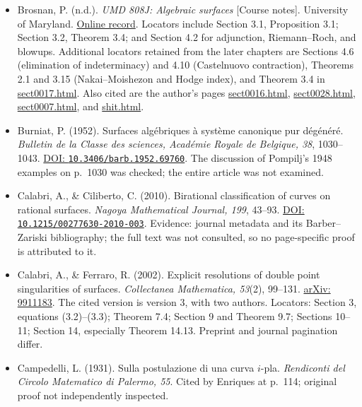 \begin{sloppypar}
\begin{itemize}
\item Brosnan, P. (n.d.). \emph{UMD 808J: Algebraic surfaces} {[}Course notes{]}. University of Maryland. \href{https://math.umd.edu/~pbrosnan/notes/Surfaces/index.html}{Online record}. Locators include Section 3.1, Proposition 3.1; Section 3.2, Theorem 3.4; and Section 4.2 for adjunction, Riemann--Roch, and blowups. Additional locators retained from the later chapters are Sections 4.6 (elimination of indeterminacy) and 4.10 (Castelnuovo contraction), Theorems 2.1 and 3.15 (Nakai--Moishezon and Hodge index), and Theorem 3.4 in \href{https://math.umd.edu/~pbrosnan/notes/Surfaces/sect0017.html}{sect0017.html}. Also cited are the author's pages \href{https://math.umd.edu/~pbrosnan/notes/Surfaces/sect0016.html}{sect0016.html}, \href{https://math.umd.edu/~pbrosnan/notes/Surfaces/sect0028.html}{sect0028.html}, \href{https://math.umd.edu/~pbrosnan/notes/Surfaces/sect0007.html}{sect0007.html}, and \href{https://math.umd.edu/~pbrosnan/notes/Surfaces/shit.html}{shit.html}.

\item Burniat, P. (1952). Surfaces algébriques à système canonique pur dégénéré. \emph{Bulletin de la Classe des sciences, Académie Royale de Belgique, 38}, 1030--1043. \href{https://doi.org/10.3406/barb.1952.69760}{DOI: \nolinkurl{10.3406/barb.1952.69760}}. The discussion of Pompilj's 1948 examples on p.~1030 was checked; the entire article was not examined.

\item Calabri, A., \& Ciliberto, C. (2010). Birational classification of curves on rational surfaces. \emph{Nagoya Mathematical Journal, 199}, 43--93. \href{https://doi.org/10.1215/00277630-2010-003}{DOI: \nolinkurl{10.1215/00277630-2010-003}}. Evidence: journal metadata and its Barber--Zariski bibliography; the full text was not consulted, so no page-specific proof is attributed to it.

\item Calabri, A., \& Ferraro, R. (2002). Explicit resolutions of double point singularities of surfaces. \emph{Collectanea Mathematica, 53}(2), 99--131. \href{https://arxiv.org/abs/math/9911183}{arXiv: 9911183}. The cited version is version 3, with two authors. Locators: Section 3, equations (3.2)--(3.3); Theorem 7.4; Section 9 and Theorem 9.7; Sections 10--11; Section 14, especially Theorem 14.13. Preprint and journal pagination differ.

\item Campedelli, L. (1931). Sulla postulazione di una curva \(i\)-pla. \emph{Rendiconti del Circolo Matematico di Palermo, 55}. Cited by Enriques at p.~114; original proof not independently inspected.


\end{itemize}
\end{sloppypar}
